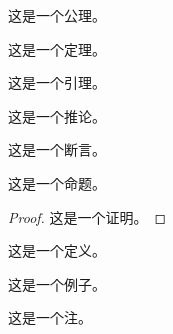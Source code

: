 \begin{axiom}
   这是一个公理。 
\end{axiom}
\begin{theorem}
   这是一个定理。 
\end{theorem}
\begin{lemma}
   这是一个引理。 
\end{lemma}
\begin{corollary}
   这是一个推论。 
\end{corollary}
\begin{assertion}
   这是一个断言。 
\end{assertion}
\begin{proposition}
   这是一个命题。 
\end{proposition}
\begin{proof}
    这是一个证明。
\end{proof}
\begin{definition}
    这是一个定义。
\end{definition}
\begin{example}
    这是一个例子。
\end{example}
\begin{remark}
    这是一个注。
\end{remark}